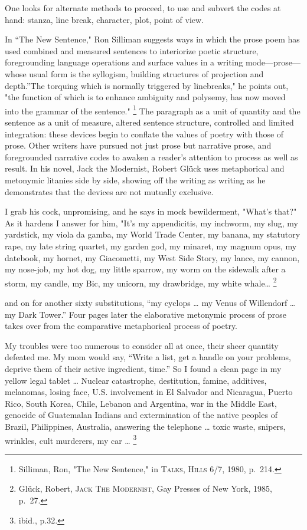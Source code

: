 \documentclass[
]{memoir}
\begin{document}
One looks for alternate methods to proceed, to use and subvert the codes
at hand: stanza, line break, character, plot, point of view.

In ``The New Sentence," Ron Silliman suggests ways in which the prose
poem has used combined and measured sentences to interiorize poetic
structure, foregrounding language operations and surface values in a
writing mode---prose---whose usual form is the syllogism, building
structures of projection and depth.''The torquing which is normally
triggered by linebreaks," he points out, "the function of which is to
enhance ambiguity and polysemy, has now moved into the grammar of the
sentence." \footnote{Silliman, Ron, "The New Sentence," in
  \textsc{Talks, Hills} 6/7, 1980, p.~214.} The paragraph as a unit of
quantity and the sentence as a unit of measure, altered sentence
structure, controlled and limited integration: these devices begin to
conflate the values of poetry with those of prose. Other writers have
pursued not just prose but narrative prose, and foregrounded narrative
codes to awaken a reader's attention to process as well as result. In
his novel, Jack the Modernist, Robert Glück uses metaphorical and
metonymic litanies side by side, showing off the writing as writing as
he demonstrates that the devices are not mutually exclusive.

I grab his cock, unpromising, and he says in mock bewilderment, "What's
that?" As it hardens I answer for him, "It's my appendicitis, my
inchworm, my slug, my yardstick, my viola da gamba, my World Trade
Center, my banana, my statutory rape, my late string quartet, my garden
god, my minaret, my magnum opus, my datebook, my hornet, my Giacometti,
my West Side Story, my lance, my cannon, my nose-job, my hot dog, my
little sparrow, my worm on the sidewalk after a storm, my candle, my
Bic, my unicorn, my drawbridge, my white whale\ldots{} \footnote{Glück,
  Robert, \textsc{Jack The Modernist}, Gay Presses of New York, 1985,
  p.~27.}

and on for another sixty substitutions, ``my cyclops \ldots{} my Venus
of Willendorf \ldots{} my Dark Tower.'' Four pages later the elaborative
metonymic process of prose takes over from the comparative metaphorical
process of poetry.

My troubles were too numerous to consider all at once, their sheer
quantity defeated me. My mom would say, ``Write a list, get a handle on
your problems, deprive them of their active ingredient, time.'' So I
found a clean page in my yellow legal tablet \ldots{} Nuclear
catastrophe, destitution, famine, additives, melanomas, losing face,
U.S. involvement in El Salvador and Nicaragua, Puerto Rico, South Korea,
Chile, Lebanon and Argentina, war in the Middle East, genocide of
Guatemalan Indians and extermination of the native peoples of Brazil,
Philippines, Australia, answering the telephone \ldots{} toxic waste,
snipers, wrinkles, cult murderers, my car \ldots{} \footnote{ibid.,
  p.32.}
\end{document}
